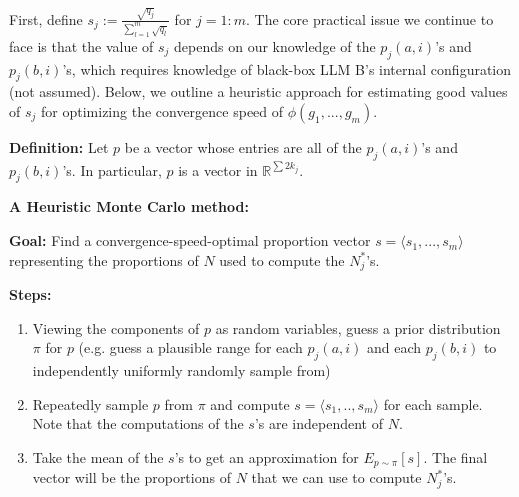 \documentclass{article}
\begin{document}
First, define $\displaystyle s_{j} :=\frac{\sqrt{q_{j}}}{\sum _{l=1}^{m}\sqrt{q_{l}}}$ for $\displaystyle j=1:m$. The core practical issue we continue to face is that the value of $\displaystyle s_{j}$ depends on our knowledge of the $\displaystyle p_{j}\left( a,i\right)$'s and $\displaystyle p_{j}\left( b,i\right)$'s, which requires knowledge of black-box LLM B's internal configuration (not assumed). Below, we outline a heuristic approach for estimating good values of $\displaystyle s_{j}$ for optimizing the convergence speed of $\displaystyle \phi \left( g_{1} ,...,g_{m}\right)$.



\textbf{Definition:} Let $\displaystyle p$ be a vector whose entries are all of the $\displaystyle p_{j}\left( a,i\right)$'s and $\displaystyle p_{j}\left( b,i\right)$'s. In particular, $\displaystyle p$ is a vector in $\displaystyle \mathbb{R}^{\sum 2k_{j}}$.



\textbf{A Heuristic Monte Carlo method:}

\textbf{Goal: }Find a convergence-speed-optimal proportion vector $\displaystyle s=\langle s_{1} ,...,s_{m} \rangle $ representing the proportions of $\displaystyle N$ used to compute the $\displaystyle N_{j}^{*}$'s.

\textbf{Steps:}
\begin{enumerate}
\item Viewing the components of $\displaystyle p$ as random variables, guess a prior distribution $\displaystyle \pi $ for $\displaystyle p$ (e.g. guess a plausible range for each $\displaystyle p_{j}\left( a,i\right)$ and each $\displaystyle p_{j}\left( b,i\right)$ to independently uniformly randomly sample from)
\item Repeatedly sample $\displaystyle p$ from $\displaystyle \pi $ and compute $\displaystyle s=\langle s_{1} ,..,s_{m} \rangle $ for each sample. Note that the computations of the $\displaystyle s$'s are independent of $\displaystyle N$.
\item Take the mean of the $\displaystyle s$'s to get an approximation for $\displaystyle E_{p\sim \pi }\left[ s\right]$. The final vector will be the proportions of $\displaystyle N$ that we can use to compute $\displaystyle N_{j}^{*}$'s.
\end{enumerate}
\end{document}
